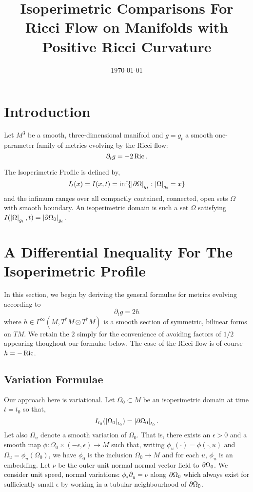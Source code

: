 \documentclass{amsart}
\title[Isoperimetric Comparison: Ricci Flow with Positive Curvature]{Isoperimetric Comparisons For Ricci Flow on Manifolds with Positive Ricci Curvature}
\date{\today}
\begin{document}
\begin{abstract}
\end{abstract}

\maketitle

\section{Introduction}
\label{sec:intro}

Let \(M^3\) be a smooth, three-dimensional manifold and \(g = g_t\) a smooth one-parameter family of metrics evolving by the Ricci flow:
\begin{equation}
\label{eq:rf}
\partial_t g = -2 \operatorname{Ric}.
\end{equation}

The Isoperimetric Profile is defined by,
\[
I_t (x) = I(x, t) = \inf\{\left|{\partial {\Omega}}\right|_{g_t} : \left|{\Omega}\right|_{g_t} = x\}
\]
and the infimum ranges over all compactly contained, connected, open sets \(\Omega\) with smooth boundary. An isoperimetric domain is such a set \(\Omega\) satisfying \(I(\left|{\Omega}\right|_{g_t}, t) = \left|{\partial {\Omega_0}}\right|_{g_t}\).

\section{A Differential Inequality For The Isoperimetric Profile}
\label{sec:iso_diff_ineq}

In this section, we begin by deriving the general formulae for metrics evolving according to
\begin{equation}
\label{eq:dtg}
\partial_t g = 2h
\end{equation}
where \(h \in \Gamma^{\infty}(M, T^{\ast}M \odot T^{\ast} M)\) is a smooth section of symmetric, bilinear forms on \(TM\). We retain the \(2\) simply for the convenience of avoiding factors of \(1/2\) appearing thoughout our formulae below. The case of the Ricci flow is of course \(h = -\operatorname{Ric}\).

\subsection{Variation Formulae}
\label{subsec:iso_diff_ineq_variation}

Our approach here is variational. Let \(\Omega_0 \subset M\) be an isoperimetric domain at time \(t = t_0\) so that,
\[
I_{t_0} (\left|{\Omega_0}\right|_{t_0}) = \left|{\partial {\Omega_0}}\right|_{t_0}.
\]
Let also \(\Omega_u\) denote a smooth variation of \(\Omega_0\). That is, there exists an \(\epsilon > 0\) and a smooth map \(\phi: \Omega_0 \times (-\epsilon, \epsilon) \to M\) such that, writing \(\phi_u(\cdot) = \phi(\cdot, u)\) and \(\Omega_u = \phi_u(\Omega_0)\), we have \(\phi_0\) is the inclusion \(\Omega_0 \to M\) and for each \(u\), \(\phi_u\) is an embedding. Let \(\nu\) be the outer unit normal normal vector field to \(\partial {\Omega_0}\). We consider unit speed, normal variations: \(\phi_{\ast} \partial_u = \nu\) along \(\partial {\Omega_0}\) which always exist for sufficiently small \(\epsilon\) by working in a tubular neighbourhood of \(\partial {\Omega_0}\).
\end{document}
